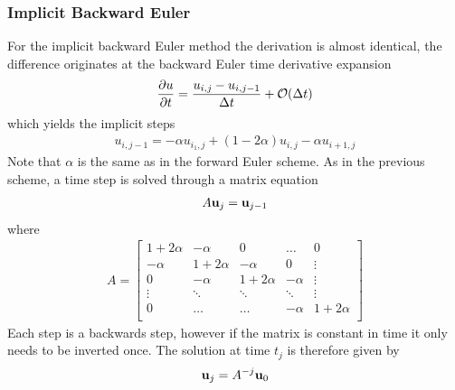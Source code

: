 \documentclass[aps,reprint]{revtex4-1}
\newcommand{\bigO}[1]{\ensuremath{\mathop{}\mathopen{}\mathcal{O}\mathopen{}\left(#1\right)}}
\begin{document}
\subsubsection{Implicit Backward Euler}
For the implicit backward Euler method the derivation is almost identical,
the difference originates at the backward Euler time derivative expansion
\begin{align*}
  \pdv{u}{t} = \frac{u_{i,j} - u_{i,j-1}}{\Delta{t}} + \bigO{\Delta{t}}
\end{align*}
which yields the implicit steps
\begin{align*}
  u_{i,j-1} = -\alpha u_{i_1,j} + (1-2\alpha) u_{i,j} - \alpha u_{i+1,j}
\end{align*}
Note that $\alpha$ is the same as in the forward Euler scheme. As in the previous
scheme, a time step is solved through a matrix equation
\begin{align*}
  A \vb{u}_{j} = \vb{u}_{j-1}
\end{align*}
where
\begin{align*}
  A = \begin{bmatrix}
        1 + 2\alpha & -\alpha      & 0            & \hdots  & 0      \\
        -\alpha      & 1 + 2\alpha & -\alpha       & 0       & \vdots \\
        0           & -\alpha      & 1 + 2\alpha  & -\alpha  & \vdots \\
        \vdots      & \ddots      & \ddots       & \ddots  & \vdots \\
        0           & \hdots      & \hdots       & -\alpha  & 1 + 2\alpha \\
      \end{bmatrix}
\end{align*}
Each step is a backwards step, however if the matrix is constant in time it only
needs to be inverted once. The solution at time $t_j$ is therefore given by
\begin{align*}
  \vb{u}_j = A^{-j} \vb{u}_0
\end{align*}
\end{document}
